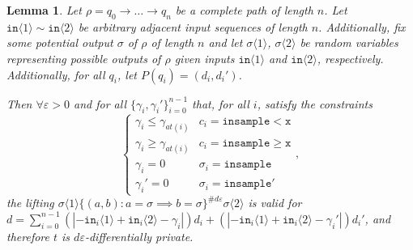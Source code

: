 \documentclass[12pt]{article}
\newcommand{\gguard}[1][x]{\texttt{insample}\geq#1}
\newcommand{\lguard}[1][x]{\texttt{insample} < #1}
\newcommand{\brangle}[1]{\langle#1 \rangle}
\newtheorem{lemma}[thm]{Lemma}
\theoremstyle{definition}
\begin{document}
\begin{lemma}\label{multTransitionsCouplingProof}
    Let $\rho = q_0\to \ldots \to q_n$ be a complete path of length $n$. 
    Let $\texttt{in}\brangle{1}\sim \texttt{in}\brangle{2}$ be arbitrary adjacent input sequences of length $n$. Additionally, fix some potential output $\sigma$ of $\rho$ of length $n$ and let $\sigma\brangle{1}$, $\sigma\brangle{2}$ be random variables representing possible outputs of $\rho$ given inputs $\texttt{in}\brangle{1}$ and $\texttt{in}\brangle{2}$, respectively. Additionally, for all $q_i$, let $P(q_i) = (d_i, d_i')$.

    Then $\forall \varepsilon>0$ and for all $\{\gamma_i, \gamma_i'\}_{i=0}^{n-1}$ that, for all $i$, satisfy the constraints \[
        \begin{cases}
          \gamma_i\leq\gamma_{at(i)} & c_i = \lguard[\texttt{x}]\\
          \gamma_i\geq\gamma_{at(i)} & c_i = \gguard[\texttt{x}]\\
          \gamma_i=0 & \sigma_i = \texttt{insample}\\
          \gamma_i'=0 & \sigma_i = \texttt{insample}'
        \end{cases},
      \]
      the lifting $\sigma\brangle{1}\{(a, b): a=\sigma\implies b=\sigma\}^{\#d\varepsilon}\sigma\brangle{2}$ is valid for $d = \sum_{i=0}^{n-1}(|-\texttt{in}_i\brangle{1}+\texttt{in}_i\brangle{2}-\gamma_i|)d_i+(|-\texttt{in}_i\brangle{1}+\texttt{in}_i\brangle{2}-\gamma_i'|)d_i'$, and therefore $t$ is $d\varepsilon$-differentially private. 
\end{lemma}
\end{document}
